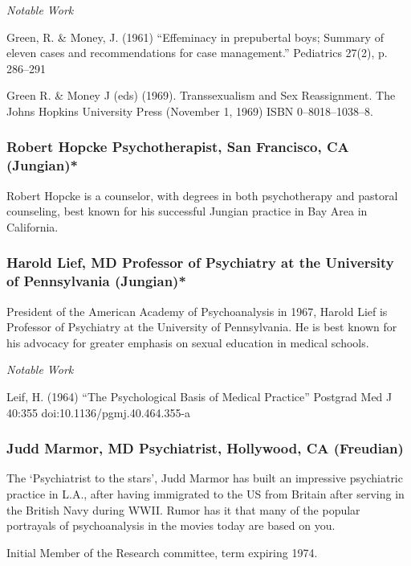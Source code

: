 \begin{refsection}
\emph{Notable Work}

Green, R. \& Money, J. (1961) ``Effeminacy in prepubertal boys; Summary of eleven cases and recommendations for case management.'' Pediatrics 27(2), p. 286--291

Green R. \& Money J (eds) (1969). Transsexualism and Sex Reassignment. The Johns Hopkins University Press (November 1, 1969) ISBN 0--8018--1038--8.

\subsubsection{Robert Hopcke Psychotherapist, San Francisco, CA (Jungian)*}
\label{roberthopckepsychotherapistsanfranciscocajungian}

Robert Hopcke is a counselor, with degrees in both psychotherapy and pastoral counseling, best known for his successful Jungian practice in Bay Area in California.

\subsubsection{Harold Lief, MD Professor of Psychiatry at the University of Pennsylvania (Jungian)*}
\label{haroldliefmdprofessorofpsychiatryattheuniversityofpennsylvaniajungian}

President of the American Academy of Psychoanalysis in 1967, Harold Lief is Professor of Psychiatry at the University of Pennsylvania. He is best known for his advocacy for greater emphasis on sexual education in medical schools.

\emph{Notable Work}

Leif, H. (1964) ``The Psychological Basis of Medical Practice'' Postgrad Med J 40:355 doi:10.1136\slash pgmj.40.464.355-a

\subsubsection{Judd Marmor, MD Psychiatrist, Hollywood, CA (Freudian)}
\label{juddmarmormdpsychiatristhollywoodcafreudian}

The `Psychiatrist to the stars', Judd Marmor has built an impressive psychiatric practice in L.A., after having immigrated to the US from Britain after serving in the British Navy during WWII. Rumor has it that many of the popular portrayals of psychoanalysis in the movies today are based on you.

Initial Member of the Research committee, term expiring 1974.


\end{refsection}
